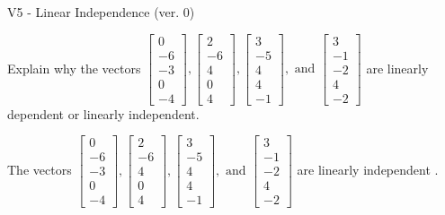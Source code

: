 \begin{exercise}
  \begin{exerciseTitle}V5 - Linear Independence (ver. 0)\end{exerciseTitle}
  \begin{exerciseStatement}
    Explain why the vectors \(\left[\begin{array}{r}
0 \\
-6 \\
-3 \\
0 \\
-4
\end{array}\right] , \left[\begin{array}{r}
2 \\
-6 \\
4 \\
0 \\
4
\end{array}\right] , \left[\begin{array}{r}
3 \\
-5 \\
4 \\
4 \\
-1
\end{array}\right] , \text{ and } \left[\begin{array}{r}
3 \\
-1 \\
-2 \\
4 \\
-2
\end{array}\right]\) are linearly dependent or linearly independent.	


  \end{exerciseStatement}
  \begin{exerciseAnswer}
   The vectors \(\left[\begin{array}{r}
0 \\
-6 \\
-3 \\
0 \\
-4
\end{array}\right] , \left[\begin{array}{r}
2 \\
-6 \\
4 \\
0 \\
4
\end{array}\right] , \left[\begin{array}{r}
3 \\
-5 \\
4 \\
4 \\
-1
\end{array}\right] , \text{ and } \left[\begin{array}{r}
3 \\
-1 \\
-2 \\
4 \\
-2
\end{array}\right]\) are 
  	 linearly independent  .
  


  \end{exerciseAnswer}
\end{exercise}